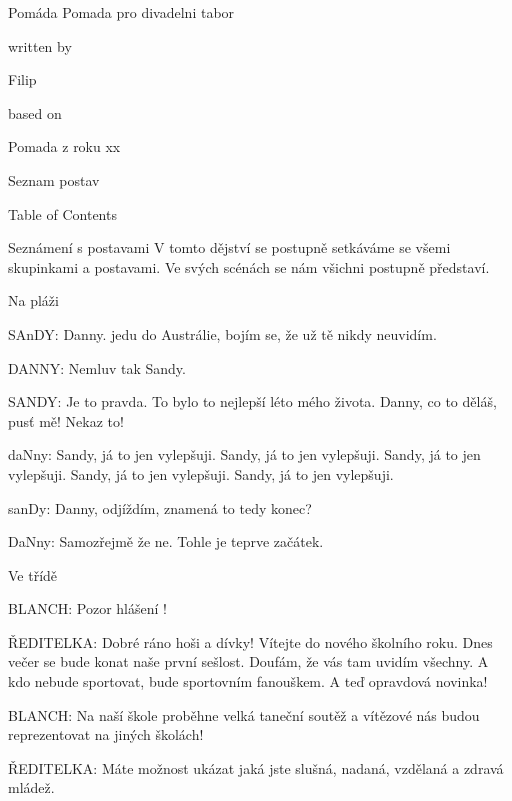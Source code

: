 ﻿\load[makra]
\load[mriezka]

\beginscenar


\tit Pomáda
Pomada pro divadelni tabor

written by

Filip

based on 

Pomada z roku xx

\nonum\notoc\sec Seznam postav

\makeindex
\endmulti

\notoc\nonum\sec Table of Contents
\maketoc


\act Seznámení s postavami
V tomto dějství se postupně setkáváme se všemi skupinkami a postavami. Ve svých scénách se nám všichni postupně představí.

\scene Na pláži

\rep SAnDY: Danny. jedu do Austrálie, bojím se, že už tě nikdy neuvidím. 

\rep DANNY: Nemluv tak Sandy.   

\rep SANDY: Je to pravda. To bylo to nejlepší léto mého života.  Danny, co to děláš, pusť mě! Nekaz to!

\rep daNny: Sandy, já to jen vylepšuji. Sandy, já to jen vylepšuji. Sandy, já to jen vylepšuji. Sandy, já to jen vylepšuji. Sandy, já to jen vylepšuji. 

\rep sanDy: Danny, odjíždím, znamená to tedy konec?

\rep DaNny: Samozřejmě že ne. Tohle je teprve začátek. 

\scene Ve třídě 

\rep BLANCH:            Pozor hlášení ! 

\rep ŘEDITELKA:                  Dobré ráno hoši a dívky! Vítejte do nového školního roku.
    Dnes večer se bude konat naše první sešlost. Doufám, že vás tam  uvidím všechny. A kdo nebude sportovat, bude sportovním fanouškem. A  teď opravdová novinka!  

\rep BLANCH:             Na naší škole proběhne velká taneční soutěž  a vítězové nás budou reprezentovat na jiných školách!

\rep ŘEDITELKA:         Máte možnost ukázat jaká jste slušná, nadaná, vzdělaná a zdravá mládež.       


